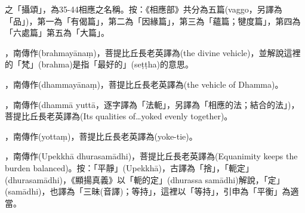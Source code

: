 \startitemgroup[noteitems]
\item{}之「攝頌」，為35-44相應之名稱。按：《相應部》共分為五篇(vaggo，另譯為「品」)，第一為「有偈篇」，第二為「因緣篇」，第三為「蘊篇；犍度篇」，第四為「六處篇」第五為「大篇」。
\stopitemgroup

\startitemgroup[noteitems]
\item{}，南傳作(brahmayānaṃ)，菩提比丘長老英譯為(the divine vehicle)，並解說這裡的「梵」(brahma)是指「最好的」(seṭṭha)的意思。
\stopitemgroup

\startitemgroup[noteitems]
\item{}，南傳作(dhammayānaṃ)，菩提比丘長老英譯為(the vehicle of Dhamma)。
\stopitemgroup

\startitemgroup[noteitems]
\item{}，南傳作(dhammā yuttā，逐字譯為「法軛」，另譯為「相應的法；結合的法」)，菩提比丘長老英譯為(Its qualities of…yoked evenly together)。
\stopitemgroup

\startitemgroup[noteitems]
\item{}，南傳作(yottaṃ)，菩提比丘長老英譯為(yoke-tie)。
\stopitemgroup

\startitemgroup[noteitems]
\item{}，南傳作(Upekkhā dhurasamādhi)，菩提比丘長老英譯為(Equanimity keeps the burden balanced)。按：「平靜」(Upekkhā)，古譯為「捨」，「軛定」(dhurasamādhi)，《顯揚真義》以「軛的定」(dhurassa samādhi)解說，「定」(samādhi)，也譯為「三昧(音譯)；等持」，這裡以「等持」，引申為「平衡」為適當。
\stopitemgroup

